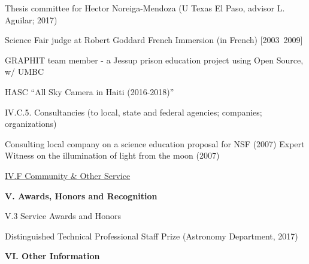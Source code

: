 \documentclass[11pt,letterpaper]{article}
\newcommand{\newi}{\newline\indent}
\begin{document}
Thesis committee for Hector Noreiga-Mendoza (U Texas El Paso, advisor L. Aguilar; 2017)

Science Fair judge at Robert Goddard French Immersion (in French) [2003~2009]

GRAPHIT team member - a Jessup prison  education project using Open Source, w/ UMBC

HASC ``All Sky Camera in Haiti (2016-2018)''





IV.C.5. Consultancies (to local, state and federal agencies; companies; organizations)

Consulting local company on a science education proposal for NSF (2007)\newi
Expert Witness on the illumination of light from the moon (2007)\newi
                

















\underline{IV.F Community \& Other Service}


\textbf{V. Awards, Honors and Recognition}



V.3 Service Awards and Honors

Distinguished Technical Professional Staff Prize (Astronomy Department, 2017)




\textbf{VI. Other Information}
\end{document}
